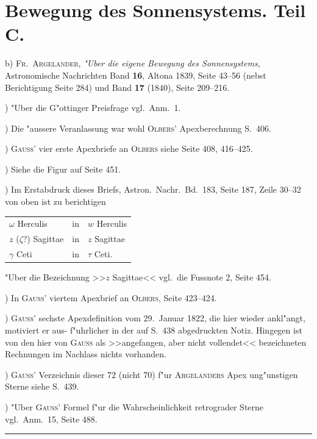 \documentclass[12pt,a4paper]{article}
\theoremstyle{plain}
\theoremstyle{definition}
\theoremstyle{remark}
\begin{document}
\newpage
\section*{Bewegung des Sonnensystems. Teil C.}

\quad b) \textsc{Fr.\ Argelander}, \textit{"Uber die eigene Bewegung des Sonnensystems}, Astronomische Nachrichten
Band \textbf{16}, Altona 1839, Seite 43--56 (nebst Berichtigung Seite 284) und Band \textbf{17} (1840), Seite 209--216.

\smallskip{}) "Uber die G"ottinger Preisfrage vgl.\ Anm.~1.

\smallskip{}) Die "aussere Veranlassung war wohl \textsc{Olbers}' Apexberechnung S.~406.

\smallskip{}) \textsc{Gauss}' vier erste Apexbriefe an \textsc{Olbers} siehe Seite 408, 416--425.

\smallskip{}) Siehe die Figur auf Seite 451.

\smallskip{}) Im Erstabdruck dieses Briefs, Astron.\ Nachr.\ Bd.~183, Seite 187, Zeile 30--32 von oben ist zu
berichtigen
\begin{center}
\begin{tabular}{l@{\quad}l@{\quad}l}
$\omega$ Herculis & in & $w$ Herculis \\
$z$ ($\zeta$?) Sagittae & in & $z$ Sagittae \\
$\gamma$ Ceti & in & $\tau$ Ceti.
\end{tabular}
\end{center}
"Uber die Bezeichnung >>$z$ Sagittae<< vgl.\ die Fussnote 2, Seite 454.

\smallskip{}) In \textsc{Gauss}' viertem Apexbrief an \textsc{Olbers}, Seite 423--424.

\smallskip{}) \textsc{Gauss}' sechste Apexdefinition vom 29.~Januar 1822, die hier wieder ankl"angt, motiviert er aus-
f"uhrlicher in der auf S.~438 abgedruckten Notiz. Hingegen ist von den hier von \textsc{Gauss} als >>angefangen,
aber nicht vollendet<< bezeichneten Rechnungen im Nachlass nichts vorhanden.

\smallskip{}) \textsc{Gauss}' Verzeichnis dieser 72 (nicht 70) f"ur \textsc{Argelanders} Apex ung"unstigen Sterne siehe S.~439.

\smallskip{}) "Uber \textsc{Gauss}' Formel f"ur die Wahrscheinlichkeit retrograder Sterne vgl.\ Anm.~15, Seite 488.

\vspace{0.5em}
\hrule
\vspace{0.5em}
\end{document}
